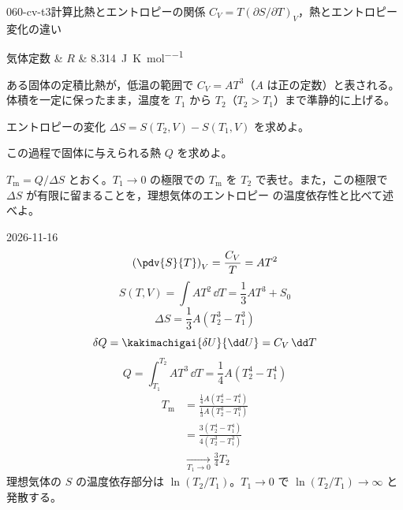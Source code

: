 \documentclass[uplatex,dvipdfmx,a4paper,11pt]{jsarticle}
\begin{document}
\begin{mondai}{060-cv-t3}{計算}{比熱とエントロピーの関係 $C_{V} = T(\partial S/\partial T)_{V}$，熱とエントロピー変化の違い}
\begin{teisuu}
  気体定数 & $R$ & \qty{8.314}{\joule\per\kelvin\per\mole}\\
\end{teisuu}
ある固体の定積比熱が，低温の範囲で $C_{V} = AT^{3}$（$A$ は正の定数）と表される。体積を一定に保ったまま，温度を $T_{1}$ から $T_{2}$（$T_{2} > T_{1}$）まで準静的に上げる。
  \begin{shoumon}
    \item エントロピーの変化 $\Delta S = S(T_{2},V) - S(T_{1},V)$ を求めよ。
    \item この過程で固体に与えられる熱 $Q$ を求めよ。
    \item $T_{\mathrm{m}} = Q/\Delta S$ とおく。$T_{1} \to 0$ の極限での $T_{\mathrm{m}}$ を $T_{2}$ で表せ。また，この極限で $\Delta S$ が有限に留まることを，理想気体のエントロピー  の温度依存性と比べて述べよ。
  \end{shoumon}
\begin{kotaeutsushi}{2026-11-16}
\[ \left(\pdv{S}{T}\right)_{V}=\frac{C_{V}}{T}=AT^{2} \]
\[ S(T,V)=\int AT^{2}\,\dd T=\frac{1}{3}AT^{3}+S_{0} \]
\[ \Delta S=\frac{1}{3}A\left(T_{2}^{3}-T_{1}^{3}\right) \]
\[ \delta Q=\kakimachigai{\delta U}{\dd U}=C_{V}\,\dd T \]
\[ Q=\int_{T_{1}}^{T_{2}}AT^{3}\,\dd T=\frac{1}{4}A\left(T_{2}^{4}-T_{1}^{4}\right) \]
\begin{align*}
T_{\mathrm{m}}&=\frac{\frac{1}{4}A(T_{2}^{4}-T_{1}^{4})}{\frac{1}{3}A(T_{2}^{3}-T_{1}^{3})}\\
&=\frac{3(T_{2}^{4}-T_{1}^{4})}{4(T_{2}^{3}-T_{1}^{3})}\\
&\xrightarrow[T_{1}\to0]{}\frac{3}{4}T_{2}
\end{align*}
理想気体の $S$ の温度依存部分は $\ln(T_{2}/T_{1})$。$T_{1}\to0$ で $\ln(T_{2}/T_{1})\to\infty$ と発散する。
\end{kotaeutsushi}
\begin{kizuki}

\end{kizuki}
\end{mondai}
\end{document}
